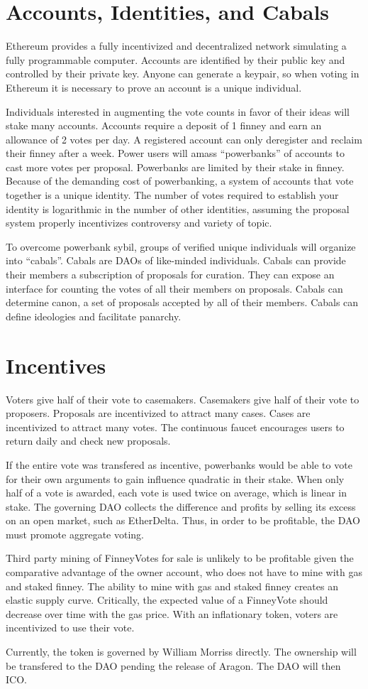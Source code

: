 \documentclass{article}
\begin{document}
\section{Accounts, Identities, and Cabals}
Ethereum provides a fully incentivized and decentralized network simulating a fully programmable computer.
Accounts are identified by their public key and controlled by their private key.
Anyone can generate a keypair, so when voting in Ethereum it is necessary to prove an account is a unique individual.
\par
Individuals interested in augmenting the vote counts in favor of their ideas will stake many accounts.
Accounts require a deposit of 1 finney and earn an allowance of 2 votes per day.
A registered account can only deregister and reclaim their finney after a week.
Power users will amass ``powerbanks'' of accounts to cast more votes per proposal.
Powerbanks are limited by their stake in finney.
Because of the demanding cost of powerbanking, a system of accounts that vote together is a unique identity.
The number of votes required to establish your identity is logarithmic in the number of other identities, assuming the proposal system properly incentivizes controversy and variety of topic.
\par
To overcome powerbank sybil, groups of verified unique individuals will organize into ``cabals''.
Cabals are DAOs of like-minded individuals.
Cabals can provide their members a subscription of proposals for curation.
They can expose an interface for counting the votes of all their members on proposals.
Cabals can determine canon, a set of proposals accepted by all of their members.
Cabals can define ideologies and facilitate panarchy.
\section{Incentives}
Voters give half of their vote to casemakers.
Casemakers give half of their vote to proposers.
Proposals are incentivized to attract many cases.
Cases are incentivized to attract many votes.
The continuous faucet encourages users to return daily and check new proposals.
\par
If the entire vote was transfered as incentive, powerbanks would be able to vote for their own arguments to gain influence quadratic in their stake.
When only half of a vote is awarded, each vote is used twice on average, which is linear in stake.
The governing DAO collects the difference and profits by selling its excess on an open market, such as EtherDelta.
Thus, in order to be profitable, the DAO must promote aggregate voting.
\par
Third party mining of FinneyVotes for sale is unlikely to be profitable given the comparative advantage of the owner account, who does not have to mine with gas and staked finney.
The ability to mine with gas and staked finney creates an elastic supply curve.
Critically, the expected value of a FinneyVote should decrease over time with the gas price.
With an inflationary token, voters are incentivized to use their vote.
\par
Currently, the token is governed by William Morriss directly.
The ownership will be transfered to the DAO pending the release of Aragon.
The DAO will then ICO.
\end{document}
